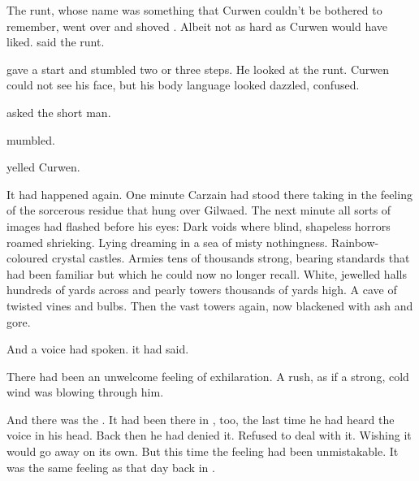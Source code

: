 The runt, whose name was something \Tepharin{} that Curwen couldn't be bothered to remember, went over and shoved \Shireyo. 
Albeit not as hard as Curwen would have liked. 
 said the runt. 

\Shireyo{} gave a start and stumbled two or three steps. 
He looked at the runt. 
Curwen could not see his face, but his body language looked dazzled, confused. 

 asked the short man. 

 \Shireyo{} mumbled. 

 yelled Curwen. 







\new
It had happened again. 
One minute Carzain had stood there taking in the feeling of the sorcerous residue that hung over Gilwaed. 
The next minute all sorts of images had flashed before his eyes: 
Dark voids where blind, shapeless horrors roamed shrieking. 
Lying dreaming in a sea of misty nothingness. 
Rainbow-coloured crystal castles. 
Armies tens of thousands strong, bearing standards that had been familiar but which he could now no longer recall. 
White, jewelled halls hundreds of yards across and pearly towers thousands of yards high. 
A cave of twisted vines and bulbs. 
Then the vast towers again, now blackened with ash and gore. 

And a voice had spoken. 
{} it had said. 
{}

There had been an unwelcome feeling of exhilaration. 
A rush, as if a strong, cold wind was blowing through him. 

And there was the \dejavu. 
It had been there in , too, the last time he had heard the voice in his head. 
Back then he had denied it. 
Refused to deal with it. 
Wishing it would go away on its own. 
But this time the feeling had been unmistakable. 
It was the same feeling as that day back in . 

